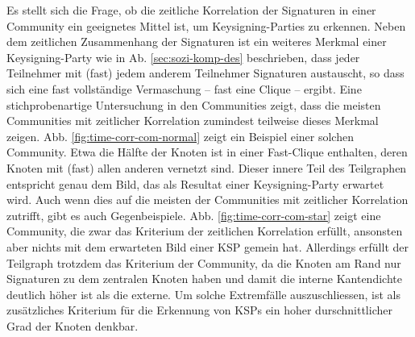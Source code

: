 Es stellt sich die Frage, ob die zeitliche Korrelation der Signaturen
in einer Community ein geeignetes Mittel ist, um Keysigning-Parties zu
erkennen. Neben dem zeitlichen Zusammenhang der Signaturen ist ein
weiteres Merkmal einer Keysigning-Party wie in
Ab. \ref{sec:sozi-komp-des} beschrieben, dass jeder Teilnehmer mit
(fast) jedem anderem Teilnehmer Signaturen austauscht, so dass sich
eine fast vollst\"andige Vermaschung -- fast eine Clique --
ergibt. Eine stichprobenartige Untersuchung in den Communities zeigt,
dass die meisten Communities mit zeitlicher Korrelation zumindest
teilweise dieses Merkmal zeigen. Abb. \ref{fig:time-corr-com-normal}
zeigt ein Beispiel einer solchen Community. Etwa die H\"alfte der
Knoten ist in einer Fast-Clique enthalten, deren Knoten mit (fast)
allen anderen vernetzt sind. Dieser innere Teil des Teilgraphen
entspricht genau dem Bild, das als Resultat einer Keysigning-Party
erwartet wird. Auch wenn dies auf die meisten der Communities mit
zeitlicher Korrelation zutrifft, gibt es auch
Gegenbeispiele. Abb. \ref{fig:time-corr-com-star} zeigt eine
Community, die zwar das Kriterium der zeitlichen Korrelation
erf\"ullt, ansonsten aber nichts mit dem erwarteten Bild einer KSP
gemein hat. Allerdings erf\"ullt der Teilgraph trotzdem das Kriterium
der Community, da die Knoten am Rand nur Signaturen zu dem zentralen
Knoten haben und damit die interne Kantendichte deutlich h\"oher ist
als die externe. Um solche Extremf\"alle auszuschliessen, ist als
zus\"atzliches Kriterium f\"ur die Erkennung von KSPs ein hoher
durschnittlicher Grad der Knoten denkbar.



